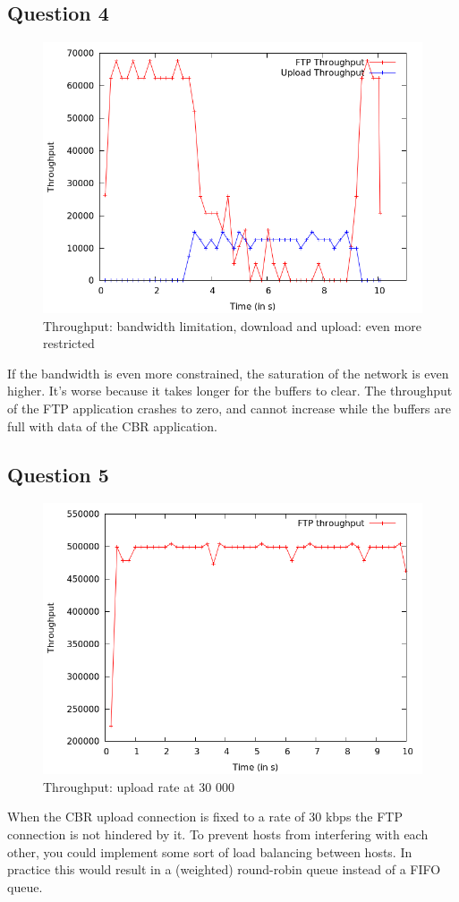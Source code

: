 \documentclass[11pt,a4paper]{article}
\begin{document}
\subsection{Question 4}
\begin{figure}[h!]
 \centering
 \includegraphics[width = 0.8\linewidth]{./ex1-part-4-1-7.png}
 \caption{Throughput: bandwidth limitation, download and upload: even more restricted}
 \label{fig:Q4}
\end{figure}
If the bandwidth is even more constrained, the saturation of the network is even higher. It's worse because it takes longer for the buffers to clear. The throughput of the FTP application crashes to zero, and cannot increase while the buffers are full with data of the CBR application. 

\subsection{Question 5}
\begin{figure}[h!]
 \centering
 \includegraphics[width = 0.8\linewidth]{./output-ex1-part5.png}
 \caption{Throughput: upload rate at 30 000}
 \label{fig:Q5}
\end{figure}
When the CBR upload connection is fixed to a rate of 30 kbps the FTP connection is not hindered by it.
To prevent hosts from interfering with each other, you could implement some sort of load balancing between hosts. In practice this would result in a (weighted) round-robin queue instead of a FIFO queue.  
\end{document}

